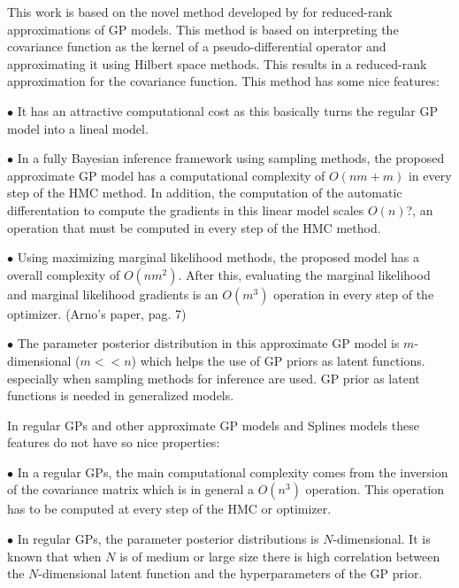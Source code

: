 \documentclass[]{interact}
\theoremstyle{plain}%
\theoremstyle{definition}
\theoremstyle{remark}
\begin{document}
This work is based on the novel method developed by \cite{solin2018hilbert} for reduced-rank approximations of GP models. This method is based on interpreting the covariance function as the kernel of a pseudo-differential operator and approximating it using Hilbert space methods. This results in a reduced-rank approximation for the covariance function. This method has some nice features:

\vspace{2mm}
$\bullet$ It has an attractive computational cost as this basically turns the regular GP model into a lineal model.

\vspace{2mm}
$\bullet$ In a fully Bayesian inference framework using sampling methods, the proposed approximate GP model has a computational complexity of $O(nm+m)$ in every step of the HMC method. In addition, the computation of the automatic differentation to compute the gradients in this linear model scales $O(n)$?, an operation that must be computed in every step of the HMC method.

\vspace{2mm}
$\bullet$ Using maximizing marginal likelihood methods, the proposed model has a overall complexity of $O(nm^2)$. After this, evaluating the marginal likelihood and marginal likelihood gradients is an $O(m^3)$ operation in every step of the optimizer. (Arno's paper, pag. 7)

\vspace{2mm}
$\bullet$ The parameter posterior distribution in this approximate GP model is $m$-dimensional ($m<<n$) which helps the use of GP priors as latent functions. especially when sampling methods for inference are used. GP prior as latent functions is needed in generalized models.

In regular GPs and other approximate GP models and Splines models these features do not have so nice properties:

\vspace{2mm}
$\bullet$ In a regular GPs, the main computational complexity comes from the inversion of the covariance matrix which is in general a $O(n^3)$ operation. This operation has to be computed at every step of the HMC or optimizer.

\vspace{2mm}
$\bullet$ In regular GPs, the parameter posterior distributions is $N$-dimensional. It is known that when $N$ is of medium or large size there is high correlation between the $N$-dimensional latent function and the hyperparameters of the GP prior.
\end{document}
